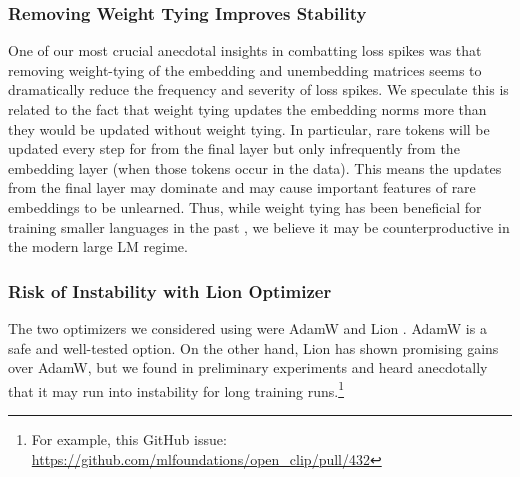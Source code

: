 \subsubsection{Removing Weight Tying Improves Stability} \label{sec:instability}


One of our most crucial anecdotal insights in combatting loss spikes was that removing weight-tying of the embedding and unembedding matrices seems to dramatically reduce the frequency and severity of loss spikes. We speculate this is related to the fact that weight tying updates the embedding norms more than they would be updated without weight tying.
In particular, rare tokens will be updated every step for from the final layer but only infrequently from the embedding layer (when those tokens occur in the data).
This means the updates from the final layer may dominate and may cause important features of rare embeddings to be unlearned.
Thus, while weight tying has been beneficial for training smaller languages in the past \citep{press-wolf-2017-using}, we believe it may be counterproductive in the modern large LM regime.


\subsubsection{Risk of Instability with Lion Optimizer}

The two optimizers we considered using were AdamW \citep{loshchilov2018decoupled} and Lion \citep{chen2023symbolic}. AdamW is a safe and well-tested option. On the other hand, Lion has shown promising gains over AdamW, but we found in preliminary experiments and heard anecdotally that it may run into instability for long training runs.\footnote{For example, this GitHub issue: \url{https://github.com/mlfoundations/open_clip/pull/432}}

